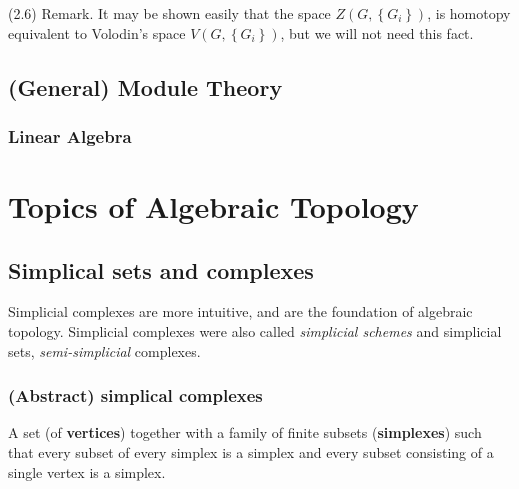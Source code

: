 \documentclass{book}
\begin{document}
(2.6) Remark. It may be shown easily that the space $Z\left(G,\left\{G_i\right\}\right)$, is homotopy equivalent to Volodin's space $V\left(G,\left\{G_i\right\}\right)$, but we will not need this fact.








\chapter{(General) Module Theory}

\section{Linear Algebra}









\part{Topics of Algebraic Topology}



\chapter{Simplical sets and complexes}
\cite{weibelIntroductionHomologicalAlgebra1994}
Simplicial complexes are more intuitive, and are the foundation of algebraic topology. Simplicial complexes were also called \textit{simplicial schemes} and simplicial sets, \textit{semi-simplicial} complexes. 

\section{(Abstract) simplical complexes}

A set (of \textbf{vertices}) together with a  family of finite subsets (\textbf{simplexes}) such that every subset of every simplex is a simplex and every subset consisting of a single vertex is a simplex.  
\end{document}
